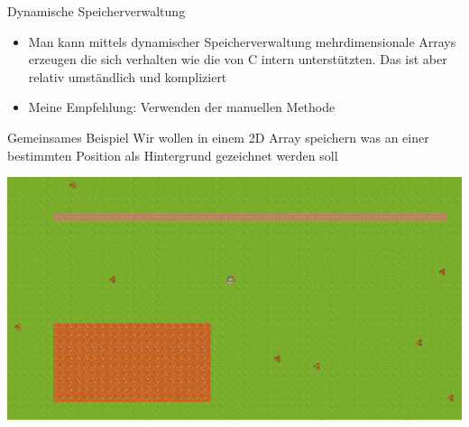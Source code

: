\documentclass[presentation]{beamer}
\begin{document}
\begin{frame}[label={sec:orgfbc042b}]{Dynamische Speicherverwaltung}
\begin{itemize}
\item Man kann mittels dynamischer Speicherverwaltung mehrdimensionale
Arrays erzeugen die sich verhalten wie die von C intern
unterstützten. Das ist aber relativ umständlich und kompliziert
\item Meine Empfehlung: \alert{Verwenden der manuellen Methode}
\end{itemize}
\end{frame}
\begin{frame}[label={sec:orgbcfecf0}]{Gemeinsames Beispiel}
Wir wollen in einem 2D Array speichern was an einer bestimmten
Position als Hintergrund gezeichnet werden soll
\begin{center}\begin{center}
\includegraphics[width=.9\linewidth]{data/00/1df613-db63-4675-993c-1159913a0378/screenshot-20200507-214418.png}
\end{center}\end{center}
\end{frame}
\end{document}
